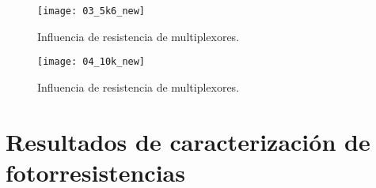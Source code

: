             \begin{figure}[hbtp]
                \centering
                \texttt{[image: 03\_5k6\_new]}
                \caption{Influencia de resistencia de multiplexores.}
                \label{fig:03_5k6_new}
            \end{figure}   

            \begin{figure}[hbtp]
                \centering
                \texttt{[image: 04\_10k\_new]}
                \caption{Influencia de resistencia de multiplexores.}
                \label{fig:04_10k_new}
            \end{figure}  
                
\newpage                      
\section{Resultados de caracterización de fotorresistencias}

            \begin{table}[htbp]
                \caption{Valor de fotorresistencias con diferentes duty cycles.}
                \begin{center}
                \label{tab:Duty_cycle}
                \end{center}
            \end{table}



